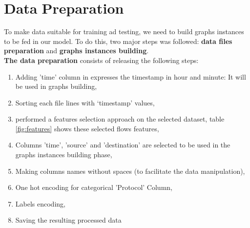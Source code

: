 \section{Data\textcolor{white}{.}Preparation} 
\label{preprocessing}
To make data suitable for training ad testing, we need to build graphs instances to be fed in our model. To do this, two major steps was followed: \textbf{data files preparation} and \textbf{graphs instances building}.\\
\textbf{The data preparation} consists of releasing the following steps:
\begin{enumerate}
    \item Adding 'time' column in expresses the timestamp in hour and minute: It will be used in graphs building,
    \item Sorting each file lines with ‘timestamp’ values,
    \item \cite{ddos2019} performed a features selection approach on the selected dataset, table \ref{fig:features} shows these selected flows features, 
    \item Columns 'time', 'source' and 'destination' are selected to be used in the graphs instances building phase,
    \item Making columns names without spaces (to facilitate the data manipulation),
    \item One hot encoding for categorical 'Protocol' Column,
    \item Labels encoding,
    \item Saving the resulting processed data


\end{enumerate}
